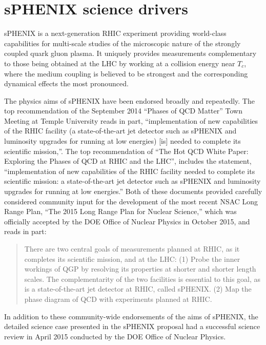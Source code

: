 \section{sPHENIX science drivers}

sPHENIX is a next-generation RHIC experiment providing world-class
capabilities for multi-scale studies of the microscopic nature
of the strongly coupled quark gluon plasma.
It uniquely provides measurements complementary to those being
obtained at the LHC by working at a collision energy near $T_c$, where
the medium coupling is believed to be strongest and the corresponding
dynamical effects the most pronounced.

The physics aims of sPHENIX have been endorsed broadly and repeatedly.
The top recommendation of the September 2014 “Phases of QCD Matter”
Town Meeting at Temple University reads in part, ``implementation of
new capabilities of the RHIC facility (a state-of-the-art jet detector
such as sPHENIX and luminosity upgrades for running at low energies)
[is] needed to complete its scientific mission,''.  The top
recommendation of ``The Hot QCD White Paper: Exploring the Phases of
QCD at RHIC and the LHC'', includes the statement, ``implementation of
new capabilities of the RHIC facility needed to complete its
scientific mission: a state-of-the-art jet detector such as sPHENIX
and luminosity upgrades for running at low energies.'' Both of these
documents provided carefully considered community input for the
development of the most recent NSAC Long Range Plan, ``The 2015 Long
Range Plan for Nuclear Science,'' which was officially accepted by the
DOE Office of Nuclear Physics in October 2015, and reads in part:

\blockquote{There are two central goals of measurements planned at
  RHIC, as it completes its scientific mission, and at the LHC: (1)
  Probe the inner workings of QGP by resolving its properties at
  shorter and shorter length scales. The complementarity of the two
  facilities is essential to this goal, as is a state-of-the-art jet
  detector at RHIC, called sPHENIX. (2) Map the phase diagram of QCD
  with experiments planned at RHIC.}

In addition to these community-wide endorsements of the aims of
sPHENIX, the detailed science case presented in the sPHENIX proposal
had a successful science review in April 2015 conducted by the DOE
Office of Nuclear Physics.


